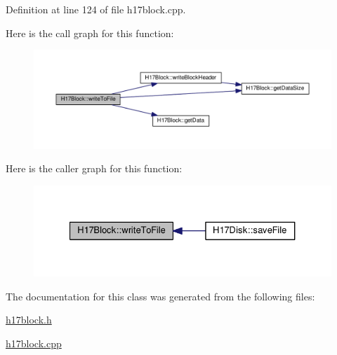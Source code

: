 Definition at line 124 of file h17block.\+cpp.



Here is the call graph for this function\+:\nopagebreak
\begin{figure}[H]
\begin{center}
\leavevmode
\includegraphics[width=350pt]{classH17Block_a59901675cd140c907fb6de4c8e0452d5_cgraph}
\end{center}
\end{figure}




Here is the caller graph for this function\+:\nopagebreak
\begin{figure}[H]
\begin{center}
\leavevmode
\includegraphics[width=327pt]{classH17Block_a59901675cd140c907fb6de4c8e0452d5_icgraph}
\end{center}
\end{figure}




The documentation for this class was generated from the following files\+:\begin{DoxyCompactItemize}
\item 
\hyperlink{h17block_8h}{h17block.\+h}\item 
\hyperlink{h17block_8cpp}{h17block.\+cpp}\end{DoxyCompactItemize}
